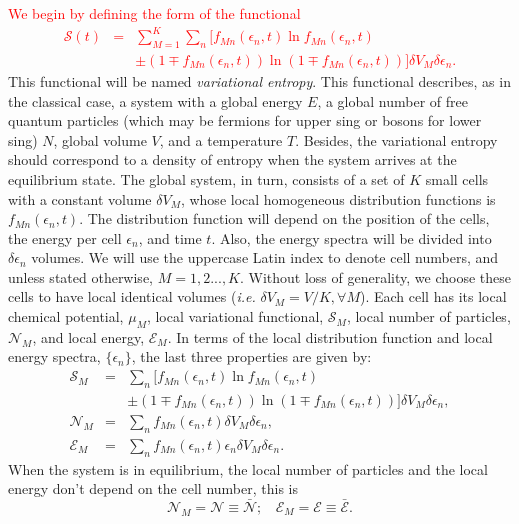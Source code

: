 \documentclass{article}
\newcommand{\Sm}{\Ss_M}
\newcommand{\de}{\delta}
\newcommand{\Ss}{\mathcal{S}}
\begin{document}
\textcolor{red}{We begin by defining the form of the functional 
\begin{eqnarray}
    \Ss (t)&=&\sum_{M=1}^{K} \sum_{n} [ f_{Mn}(\epsilon_{n},t) \ln f_{Mn}(\epsilon_{n},t)\nonumber \\
    &&\pm (1 \mp f_{Mn}(\epsilon_{n},t)) \ln (1 \mp f_{Mn}(\epsilon_{n},t)) ]   \delta V_M \delta \epsilon_n \label{entropy}.
\end{eqnarray}}
This functional will be named \textit{variational entropy}.
This functional describes, as in the classical case, a system with a global energy $E$, a global number of free
quantum particles (which may be fermions for upper sing or bosons for lower sing) $N$, global volume $V$, and a temperature $T$. 
Besides, the variational entropy should correspond to a density of entropy when the system arrives at the equilibrium state. The
global system, in turn, consists of a set of $K$ small cells with a constant volume $\delta V_M$, whose local homogeneous distribution functions is $f_{Mn}(\epsilon_{n},t)$. The distribution function will depend on the position of the cells, the energy per cell $\epsilon_{n}$, and time $t$. Also, the energy spectra will be divided into $\delta \epsilon_n$ volumes. We will use the uppercase Latin index to denote cell numbers, and unless stated otherwise, $M = 1, 2 . . . , K$. Without loss of generality, we choose these cells to have
local identical volumes (\textit{i.e.} $\delta V_M = V/K, \forall M$). Each cell has its local chemical potential, $\mu_M$, local
variational functional, $\Sm$, local number of particles, $\mathcal{N}_M$, and local energy, $\mathcal{E}_M$. In terms of the local distribution 
function and local energy spectra, $\{\epsilon_{n}\}$, the last three properties are given by:
\begin{eqnarray}
    \Sm &=&  \sum_{n} [ f_{Mn}(\epsilon_{n},t) \ln f_{Mn}(\epsilon_{n},t)\nonumber \\
    &&\pm (1 \mp f_{Mn}(\epsilon_{n},t)) \ln (1 \mp f_{Mn}(\epsilon_{n},t)) ] \de V_M \delta \epsilon_n \label{entropycell},\\
    {\mathcal{N}}_M&=& \sum_{n}f_{Mn}(\epsilon_{n} ,t) \de V_M \delta \epsilon_n, \nonumber \\
{\mathcal{E}}_M&=& \sum_{n}f_{Mn}(\epsilon_{n},t)\epsilon_{n} \de V_M \delta \epsilon_n.
\end{eqnarray}
When the system is in equilibrium, the local number of particles and the local energy don't depend on the cell number, this is
\begin{equation}
   {\mathcal{N}}_M=\mathcal{N}\equiv \bar{\mathcal{N}}; \ \ \ \  {\mathcal{E}}_M=\mathcal{E}\equiv \bar{\mathcal{E}}.
\end{equation}
\end{document}
